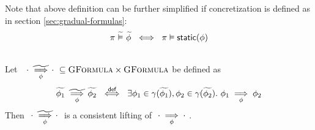 Note that above definition can be further simplified if concretization is defined as in section \ref{sec:gradual-formulas}:
\begin{displaymath} 
\pi \,\,\widetilde{\vDash}\,\, \widetilde{\phi} ~\iff~ \pi \vDash \textsf{static}(\phi) 
\end{displaymath}

\begin{lemma}~\\
    Let $~~{\cdot} \,\,\underset{\phi}{\widetilde{\implies}}\, {\cdot}~ \subseteq \textsc{GFormula} \times \textsc{GFormula}$ be defined as
    \begin{displaymath} 
    {\widetilde{\phi_1}} \,\,\underset{\phi}{\widetilde{\implies}}\, {\widetilde{\phi_2}} ~\overset{\textsf{def}}{\iff}~ \exists \phi_1 \in \gamma(\widetilde{\phi_1}), \phi_2 \in \gamma(\widetilde{\phi_2}).~ {\phi_1} \underset{\phi}{\implies} {\phi_2}
    \end{displaymath}
    Then $~{\cdot} \,\,\underset{\phi}{\widetilde{\implies}}\, {\cdot}~$ is a consistent lifting of $~{\cdot} \underset{\phi}{\implies} {\cdot}~$.
\end{lemma}


